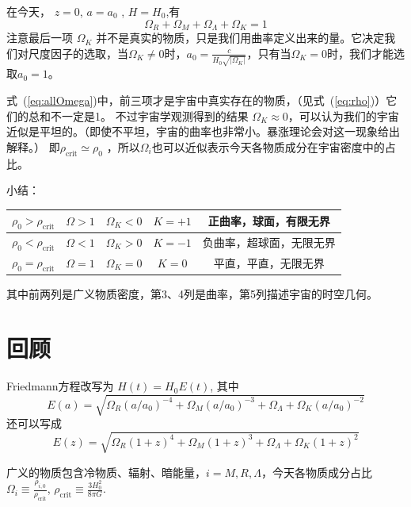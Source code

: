 \documentclass[]{ctexart}
\newcommand{\refeq}[1]{式~(\ref{#1})}
\begin{document}
在今天， $z=0$, $a=a_0$ , $H=H_0$,有
\begin{equation}
    \Omega_R + \Omega_M + \Omega_\Lambda + \Omega_K = 1 \label{eq:allOmega}
\end{equation}
注意最后一项 $\Omega_K$ 并不是真实的物质，只是我们用曲率定义出来的量。它决定我们对尺度因子的选取，当$\Omega_K\neq 0$时，$a_0=\frac{c}{H_0\sqrt{|\Omega_K|}}$，只有当$\Omega_K = 0$时，我们才能选取$a_0=1$。

\refeq{eq:allOmega}中，前三项才是宇宙中真实存在的物质，（见\refeq{eq:rho}）它们的总和不一定是1。
不过宇宙学观测得到的结果 $\Omega_K \approx 0$，可以认为我们的宇宙近似是平坦的。（即使不平坦，宇宙的曲率也非常小。暴涨理论会对这一现象给出解释。） 
即$\rho_\text{crit}\simeq\rho_0$ ，所以$\Omega_i$也可以近似表示今天各物质成分在宇宙密度中的占比。

小结：
\begin{table}[H]
    \centering
    \begin{tabular}{|c|c|c|c|c|}
    \hline
    $\rho_0>\rho_\text{crit}$  & $\Omega>1$ & $\Omega_K<0$ & $K=+1$ & 正曲率，球面，有限无界 \\ \hline
    $\rho_0<\rho_\text{crit}$  & $\Omega<1$ & $\Omega_K>0$ & $K=-1$ & 负曲率，超球面，无限无界  \\ \hline
    $\rho_0=\rho_\text{crit}$  & $\Omega=1$ & $\Omega_K=0$ & $K=0$ & 平直，平直，无限无界 \\ \hline
    \end{tabular}
\end{table}

其中前两列是广义物质密度，第3、4列是曲率，第5列描述宇宙的时空几何。


\section{回顾}

Friedmann方程改写为 $H(t)= H_0 E(t)$,   其中 
\begin{equation}
    E(a)=\sqrt{\Omega_R(a/a_0)^{-4}+\Omega_M(a/a_0)^{-3}+\Omega_\Lambda+\Omega_K(a/a_0)^{-2}}
\end{equation}
还可以写成
\begin{equation}
    E(z)=\sqrt{\Omega_R(1+z)^{4}+\Omega_M(1+z)^{3}+\Omega_\Lambda+\Omega_K(1+z)^{2}}
\end{equation}

广义的物质包含冷物质、辐射、暗能量，$i=M,R,\Lambda$，今天各物质成分占比 $\Omega_i\equiv\frac{\rho_{i,0}}{\rho_\text{crit}}$, $\rho_\text{crit}\equiv\frac{3H_0^2}{8\pi G}$.
\end{document}
